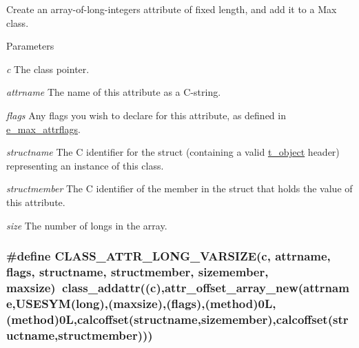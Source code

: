Create an array-\/of-\/long-\/integers attribute of fixed length, and add it to a Max class. 
\begin{DoxyParams}{Parameters}
\item[{\em c}]The class pointer. \item[{\em attrname}]The name of this attribute as a C-\/string. \item[{\em flags}]Any flags you wish to declare for this attribute, as defined in \hyperlink{group__attr_gaf296cfc6741bb19207f6ed8062809115}{e\_\-max\_\-attrflags}. \item[{\em structname}]The C identifier for the struct (containing a valid \hyperlink{structt__object}{t\_\-object} header) representing an instance of this class. \item[{\em structmember}]The C identifier of the member in the struct that holds the value of this attribute. \item[{\em size}]The number of longs in the array. \end{DoxyParams}
\hypertarget{group__attr_ga481f8679851e2f6d5d99196ec86bc4e1}{
\subsubsection[{CLASS\_\-ATTR\_\-LONG\_\-VARSIZE}]{\setlength{\rightskip}{0pt plus 5cm}\#define CLASS\_\-ATTR\_\-LONG\_\-VARSIZE(c, \/  attrname, \/  flags, \/  structname, \/  structmember, \/  sizemember, \/  maxsize)~class\_\-addattr((c),attr\_\-offset\_\-array\_\-new(attrname,USESYM(long),(maxsize),(flags),({\bf method})0L,(method)0L,calcoffset(structname,sizemember),calcoffset(structname,structmember)))}}
\label{group__attr_ga481f8679851e2f6d5d99196ec86bc4e1}


